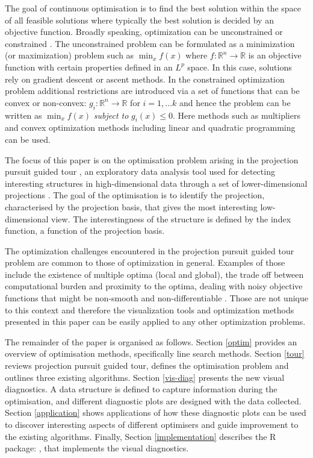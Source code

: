 The goal of continuous optimisation is to find the best solution within
the space of all feasible solutions where typically the best solution is
decided by an objective function. Broadly speaking, optimization can be
unconstrained or constrained \citep{kelley1999iterative}. The
unconstrained problem can be formulated as a minimization (or
maximization) problem such as \(\min_{x} f(x)\) where
\(f:\mathbb{R}^n \rightarrow \mathbb{R}\) is an objective function with
certain properties defined in an \(L^p\) space. In this case, solutions
rely on gradient descent or ascent methods. In the constrained
optimization problem additional restrictions are introduced via a set of
functions that can be convex or non-convex:
\(g_i:\mathbb{R}^n \rightarrow \mathbb{R}\) for \(i = 1, \ldots k\) and
hence the problem can be written as \(\min_{x} f(x)\) \emph{subject to}
\(g_i(x) \leq 0\). Here methods such as multipliers and convex
optimization methods including linear and quadratic programming can be
used.

The focus of this paper is on the optimisation problem arising in the
projection pursuit guided tour \citep{buja2005computational}, an
exploratory data analysis tool used for detecting interesting structures
in high-dimensional data through a set of lower-dimensional projections
\citep{cook2008grand}. The goal of the optimisation is to identify the
projection, characterised by the projection basis, that gives the most
interesting low-dimensional view. The interestingness of the structure
is defined by the index function, a function of the projection basis.

The optimization challenges encountered in the projection pursuit guided
tour problem are common to those of optimization in general. Examples of
those include the existence of multiple optima (local and global), the
trade off between computational burden and proximity to the optima,
dealing with noisy objective functions that might be non-smooth and
non-differentiable \citep{jones1998efficient}. Those are not unique to
this context and therefore the visualization tools and optimization
methods presented in this paper can be easily applied to any other
optimization problems.

The remainder of the paper is organised as follows. Section \ref{optim}
provides an overview of optimisation methods, specifically line search
methods. Section \ref{tour} reviews projection pursuit guided tour,
defines the optimisation problem and outlines three existing algorithms.
Section \ref{vis-diag} presents the new visual diagnostics. A data
structure is defined to capture information during the optimisation, and
different diagnostic plots are designed with the data collected. Section
\ref{application} shows applications of how these diagnostic plots can
be used to discover interesting aspects of different optimisers and
guide improvement to the existing algorithms. Finally, Section
\ref{implementation} describes the R package: , that
implements the visual diagnostics.

